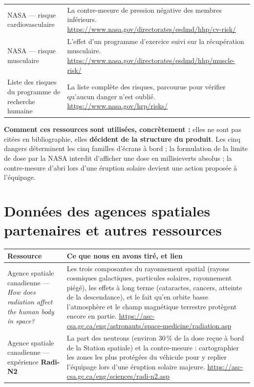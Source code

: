\documentclass[11pt,a4paper]{article}
\let\sectionorig\section
\renewcommand{\section}{\Needspace{5\baselineskip}\sectionorig}
\begin{document}
\begin{tabularx}{\textwidth}{@{}L{4.9cm} X@{}}
NASA --- risque cardiovasculaire & La contre-mesure de pression n\'egative des membres inf\'erieurs. \newline \url{https://www.nasa.gov/directorates/esdmd/hhp/cv-risk/} \\
NASA --- risque musculaire & L'effet d'un programme d'exercice suivi sur la r\'ecup\'eration musculaire. \newline \url{https://www.nasa.gov/directorates/esdmd/hhp/muscle-risk/} \\
Liste des risques du programme de recherche humaine & La liste compl\`ete des risques, parcourue pour v\'erifier qu'aucun danger n'est oubli\'e. \newline \url{https://www.nasa.gov/hrp/risks/} \\
\bottomrule
\end{tabularx}

\vspace{0.25cm}
\textbf{Comment ces ressources sont utilis\'ees, concr\`etement :} elles ne sont pas cit\'ees en
bibliographie, elles \textbf{d\'ecident de la structure du produit}. Les cinq dangers d\'eterminent les
cinq familles d'\'ecrans \`a bord ; la formulation de la limite de dose par la NASA interdit
d'afficher une dose en millisieverts absolus ; la contre-mesure d'abri lors d'une \'eruption solaire
devient une action propos\'ee \`a l'\'equipage.

\section{Donn\'ees des agences spatiales partenaires et autres ressources}


\vspace{0.25cm}
\begin{tabularx}{\textwidth}{@{}L{4.9cm} X@{}}
\toprule
\textbf{Ressource} & \textbf{Ce que nous en avons tir\'e, et lien} \\
\midrule
Agence spatiale canadienne --- \emph{How does radiation affect the human body in space?} & Les trois composantes du rayonnement spatial (rayons cosmiques galactiques, particules solaires, rayonnement pi\'eg\'e), les effets \`a long terme (cataractes, cancers, atteinte de la descendance), et le fait qu'en orbite basse l'atmosph\`ere et le champ magn\'etique terrestre prot\`egent encore en partie. \newline \url{https://asc-csa.gc.ca/eng/astronauts/space-medicine/radiation.asp} \\
Agence spatiale canadienne --- exp\'erience \textbf{Radi-N2} & La part des neutrons (environ 30\,\% de la dose re\c{c}ue \`a bord de la Station spatiale) et la contre-mesure : cartographier les zones les plus prot\'eg\'ees du v\'ehicule pour y replier l'\'equipage lors d'une \'eruption solaire majeure. \newline \url{https://asc-csa.gc.ca/eng/sciences/radi-n2.asp} \\
\bottomrule
\end{tabularx}
\end{document}
